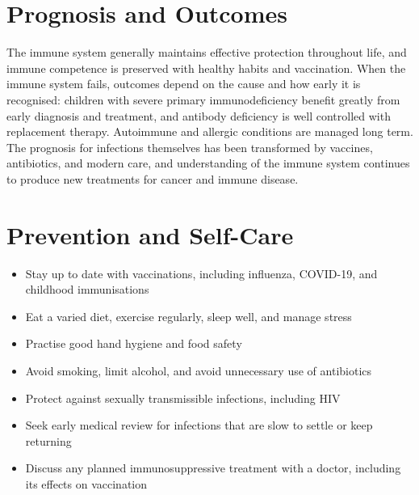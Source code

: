 \section*{Prognosis and Outcomes}
The immune system generally maintains effective protection throughout life, and immune competence is preserved with healthy habits and vaccination. When the immune system fails, outcomes depend on the cause and how early it is recognised: children with severe primary immunodeficiency benefit greatly from early diagnosis and treatment, and antibody deficiency is well controlled with replacement therapy. Autoimmune and allergic conditions are managed long term. The prognosis for infections themselves has been transformed by vaccines, antibiotics, and modern care, and understanding of the immune system continues to produce new treatments for cancer and immune disease.

\section*{Prevention and Self-Care}
\begin{itemize}
    \item Stay up to date with vaccinations, including influenza, COVID-19, and childhood immunisations
    \item Eat a varied diet, exercise regularly, sleep well, and manage stress
    \item Practise good hand hygiene and food safety
    \item Avoid smoking, limit alcohol, and avoid unnecessary use of antibiotics
    \item Protect against sexually transmissible infections, including HIV
    \item Seek early medical review for infections that are slow to settle or keep returning
    \item Discuss any planned immunosuppressive treatment with a doctor, including its effects on vaccination
\end{itemize}

